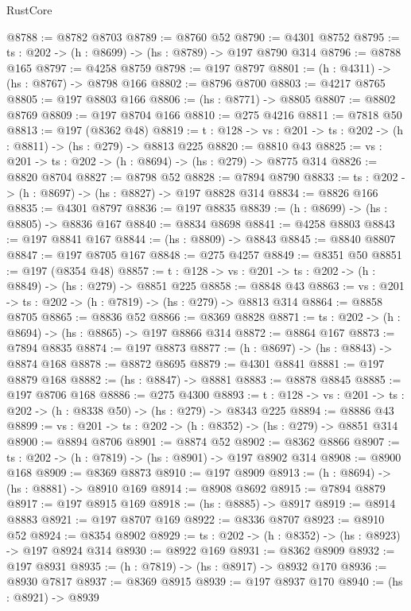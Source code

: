 \begin{lexlean}{RustCore}
\begin{coremodule}
@8788 := @8782 @8703
@8789 := @8760 @52
@8790 := @4301 @8752
@8795 := {ts : @202} -> (h : @8699) -> (hs : @8789) -> @197 @8790 @314
@8796 := @8788 @165
@8797 := @4258 @8759
@8798 := @197 @8797
@8801 := (h : @4311) -> (hs : @8767) -> @8798 @166
@8802 := @8796 @8700
@8803 := @4217 @8765
@8805 := @197 @8803 @166
@8806 := (hs : @8771) -> @8805
@8807 := @8802 @8769
@8809 := @197 @8704 @166
@8810 := @275 @4216
@8811 := @7818 @50
@8813 := @197 (@8362 @48)
@8819 := {t : @128} -> {vs : @201} -> {ts : @202} -> (h : @8811) -> (hs : @279) -> @8813 @225
@8820 := @8810 @43
@8825 := {vs : @201} -> {ts : @202} -> (h : @8694) -> (hs : @279) -> @8775 @314
@8826 := @8820 @8704
@8827 := @8798 @52
@8828 := @7894 @8790
@8833 := {ts : @202} -> (h : @8697) -> (hs : @8827) -> @197 @8828 @314
@8834 := @8826 @166
@8835 := @4301 @8797
@8836 := @197 @8835
@8839 := (h : @8699) -> (hs : @8805) -> @8836 @167
@8840 := @8834 @8698
@8841 := @4258 @8803
@8843 := @197 @8841 @167
@8844 := (hs : @8809) -> @8843
@8845 := @8840 @8807
@8847 := @197 @8705 @167
@8848 := @275 @4257
@8849 := @8351 @50
@8851 := @197 (@8354 @48)
@8857 := {t : @128} -> {vs : @201} -> {ts : @202} -> (h : @8849) -> (hs : @279) -> @8851 @225
@8858 := @8848 @43
@8863 := {vs : @201} -> {ts : @202} -> (h : @7819) -> (hs : @279) -> @8813 @314
@8864 := @8858 @8705
@8865 := @8836 @52
@8866 := @8369 @8828
@8871 := {ts : @202} -> (h : @8694) -> (hs : @8865) -> @197 @8866 @314
@8872 := @8864 @167
@8873 := @7894 @8835
@8874 := @197 @8873
@8877 := (h : @8697) -> (hs : @8843) -> @8874 @168
@8878 := @8872 @8695
@8879 := @4301 @8841
@8881 := @197 @8879 @168
@8882 := (hs : @8847) -> @8881
@8883 := @8878 @8845
@8885 := @197 @8706 @168
@8886 := @275 @4300
@8893 := {t : @128} -> {vs : @201} -> {ts : @202} -> (h : @8338 @50) -> (hs : @279) -> @8343 @225
@8894 := @8886 @43
@8899 := {vs : @201} -> {ts : @202} -> (h : @8352) -> (hs : @279) -> @8851 @314
@8900 := @8894 @8706
@8901 := @8874 @52
@8902 := @8362 @8866
@8907 := {ts : @202} -> (h : @7819) -> (hs : @8901) -> @197 @8902 @314
@8908 := @8900 @168
@8909 := @8369 @8873
@8910 := @197 @8909
@8913 := (h : @8694) -> (hs : @8881) -> @8910 @169
@8914 := @8908 @8692
@8915 := @7894 @8879
@8917 := @197 @8915 @169
@8918 := (hs : @8885) -> @8917
@8919 := @8914 @8883
@8921 := @197 @8707 @169
@8922 := @8336 @8707
@8923 := @8910 @52
@8924 := @8354 @8902
@8929 := {ts : @202} -> (h : @8352) -> (hs : @8923) -> @197 @8924 @314
@8930 := @8922 @169
@8931 := @8362 @8909
@8932 := @197 @8931
@8935 := (h : @7819) -> (hs : @8917) -> @8932 @170
@8936 := @8930 @7817
@8937 := @8369 @8915
@8939 := @197 @8937 @170
@8940 := (hs : @8921) -> @8939

\end{coremodule}
\end{lexlean}
